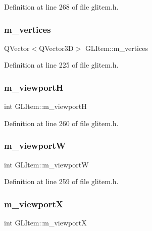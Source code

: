Definition at line 268 of file glitem.\+h.

\mbox{\label{class_g_l_item_acf6802c6d50a16ff8fbb0b0b1413dcc8}} 
\subsubsection{\texorpdfstring{m\_vertices}{m\_vertices}}
{\footnotesize\ttfamily Q\+Vector$<$Q\+Vector3D$>$ G\+L\+Item\+::m\+\_\+vertices\hspace{0.3cm}{\ttfamily [protected]}}



Definition at line 225 of file glitem.\+h.

\mbox{\label{class_g_l_item_a7b4451d24045e056aed2e395174714e0}} 
\subsubsection{\texorpdfstring{m\_viewportH}{m\_viewportH}}
{\footnotesize\ttfamily int G\+L\+Item\+::m\+\_\+viewportH\hspace{0.3cm}{\ttfamily [protected]}}



Definition at line 260 of file glitem.\+h.

\mbox{\label{class_g_l_item_a7941d53165e82da781e98f1523d1189c}} 
\subsubsection{\texorpdfstring{m\_viewportW}{m\_viewportW}}
{\footnotesize\ttfamily int G\+L\+Item\+::m\+\_\+viewportW\hspace{0.3cm}{\ttfamily [protected]}}



Definition at line 259 of file glitem.\+h.

\mbox{\label{class_g_l_item_a6f01d6d9f59a2c151ba7ceef071b1689}} 
\subsubsection{\texorpdfstring{m\_viewportX}{m\_viewportX}}
{\footnotesize\ttfamily int G\+L\+Item\+::m\+\_\+viewportX\hspace{0.3cm}{\ttfamily [protected]}}



